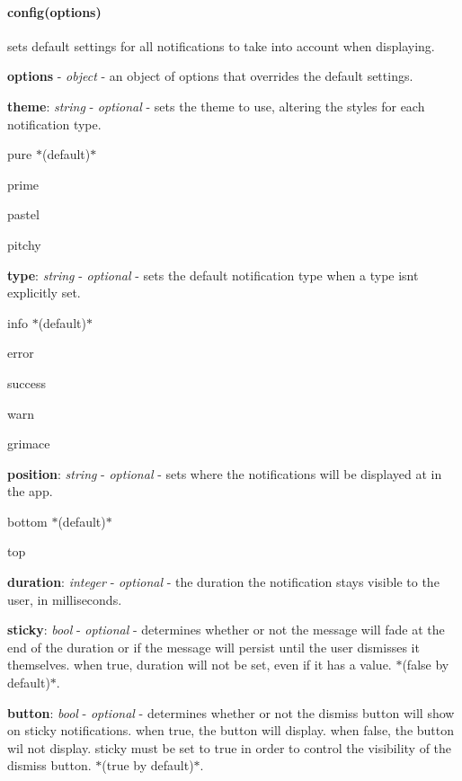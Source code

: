 \paragraph*{config(options)}

sets default settings for all notifications to take into account when displaying.
\begin{DoxyItemize}
\item {\bfseries options} -\/ {\itshape object} -\/ an object of options that overrides the default settings.
\begin{DoxyItemize}
\item {\bfseries theme}\+: {\itshape string} -\/ {\itshape optional} -\/ sets the theme to use, altering the styles for each notification type.
\begin{DoxyItemize}
\item pure $\ast$(default)$\ast$
\item prime
\item pastel
\item pitchy
\end{DoxyItemize}
\item {\bfseries type}\+: {\itshape string} -\/ {\itshape optional} -\/ sets the default notification type when a type isn\textquotesingle{}t explicitly set.
\begin{DoxyItemize}
\item info $\ast$(default)$\ast$
\item error
\item success
\item warn
\item grimace
\end{DoxyItemize}
\item {\bfseries position}\+: {\itshape string} -\/ {\itshape optional} -\/ sets where the notifications will be displayed at in the app.
\begin{DoxyItemize}
\item bottom $\ast$(default)$\ast$
\item top
\end{DoxyItemize}
\item {\bfseries duration}\+: {\itshape integer} -\/ {\itshape optional} -\/ the duration the notification stays visible to the user, in milliseconds.
\item {\bfseries sticky}\+: {\itshape bool} -\/ {\itshape optional} -\/ determines whether or not the message will fade at the end of the duration or if the message will persist until the user dismisses it themselves. when true, duration will not be set, even if it has a value. $\ast$(false by default)$\ast$.
\item {\bfseries button}\+: {\itshape bool} -\/ {\itshape optional} -\/ determines whether or not the dismiss button will show on sticky notifications. when true, the button will display. when false, the button wil not display. sticky must be set to true in order to control the visibility of the dismiss button. $\ast$(true by default)$\ast$.
\end{DoxyItemize}
\end{DoxyItemize}

